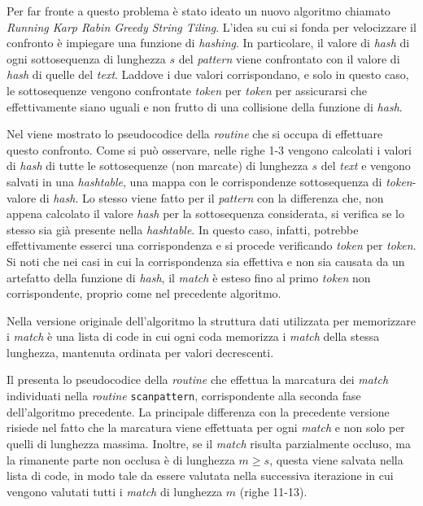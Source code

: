 Per far fronte a questo problema è stato ideato un nuovo algoritmo chiamato \textit{Running Karp Rabin Greedy String Tiling}.
%
L'idea su cui si fonda per velocizzare il confronto è impiegare una funzione di \textit{hashing}.
%
In particolare, il valore di \textit{hash} di ogni sottosequenza di lunghezza $s$ del \textit{pattern} viene confrontato con il valore di \textit{hash} di quelle del \textit{text}.
%
Laddove i due valori corrispondano, e solo in questo caso, le sottosequenze vengono confrontate \textit{token} per \textit{token} per assicurarsi che effettivamente siano uguali e non frutto di una collisione della funzione di \textit{hash}.

Nel  viene mostrato lo pseudocodice della \textit{routine} che si occupa di effettuare questo confronto.
%
Come si può osservare, nelle righe 1-3 vengono calcolati i valori di \textit{hash} di tutte le sottosequenze (non marcate) di lunghezza $s$ del \textit{text} e vengono salvati in una \textit{hashtable}, una mappa con le corrispondenze sottosequenza di \textit{token}-valore di \textit{hash}.
%
Lo stesso viene fatto per il \textit{pattern} con la differenza che, non appena calcolato il valore \textit{hash} per la sottosequenza considerata, si verifica se lo stesso sia già presente nella \textit{hashtable}.
%
In questo caso, infatti, potrebbe effettivamente esserci una corrispondenza e si procede verificando \textit{token} per \textit{token}.
%
Si noti che nei casi in cui la corrispondenza sia effettiva e non sia causata da un artefatto della funzione di \textit{hash}, il \textit{match} è esteso fino al primo \textit{token} non corrispondente, proprio come nel precedente algoritmo.



Nella versione originale dell'algoritmo la struttura dati utilizzata per memorizzare i \textit{match} è una lista di code in cui ogni coda memorizza i \textit{match} della stessa lunghezza, mantenuta ordinata per valori decrescenti.

Il  presenta lo pseudocodice della \textit{routine} che effettua la marcatura dei \textit{match} individuati nella \textit{routine} \texttt{scanpattern}, corrispondente alla seconda fase dell'algoritmo precedente.
%
La principale differenza con la precedente versione risiede nel fatto che la marcatura viene effettuata per ogni \textit{match} e non solo per quelli di lunghezza massima.
%
Inoltre, se il \textit{match} risulta parzialmente occluso, ma la rimanente parte non occlusa è  di lunghezza $m \ge s$, questa viene salvata nella lista di code, in modo tale da essere valutata nella successiva iterazione in cui vengono valutati tutti i \textit{match} di lunghezza $m$ (righe 11-13).

